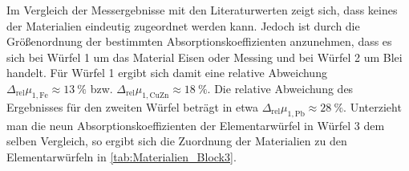 

Im Vergleich der Messergebnisse mit den Literaturwerten zeigt sich, dass keines der Materialien 
eindeutig zugeordnet werden kann. Jedoch ist durch die Größenordnung der bestimmten Absorptionskoeffizienten
anzunehmen, dass es sich bei Würfel 1 um das Material Eisen oder Messing und bei Würfel 2 um Blei handelt.
Für Würfel 1 ergibt sich damit eine relative Abweichung $\Delta_{\mathrm{rel}}\mu_{1,\mathrm{Fe}} \approx \SI{13}{\percent}$ bzw.
$\Delta_{\mathrm{rel}}\mu_{1,\mathrm{CuZn}} \approx \SI{18}{\percent}$. 
Die relative Abweichung des Ergebnisses für den zweiten Würfel
beträgt in etwa $\Delta_{\mathrm{rel}}\mu_{1,\mathrm{Pb}} \approx \SI{28}{\percent}$.
Unterzieht man die neun Absorptionskoeffizienten der Elementarwürfel in Würfel 3 dem selben Vergleich,
so ergibt sich die Zuordnung der Materialien zu den Elementarwürfeln in \cref{tab:Materialien_Block3}.


